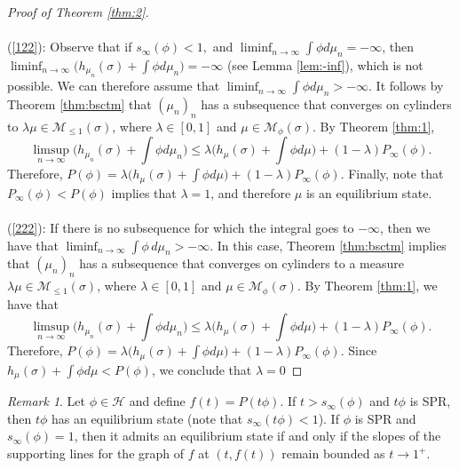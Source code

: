 \documentclass[letterpaper,11pt]{amsart}
\theoremstyle{plain}
\theoremstyle{plain}
\theoremstyle{definition}
\theoremstyle{remark}
\newtheorem{remark}{Remark}[section]
\def\M{{\mathcal M}}
\def\H{{\mathcal H}}
\begin{document}
\begin{proof}[Proof of Theorem \ref{thm:2}] 
\noindent\\\\
(\ref{122}): Observe that if $s_\infty(\phi)<1,$ and $\liminf_{n\to\infty}\int \phi d\mu_n=-\infty$, then $\liminf_{n\to\infty} \big(h_{\mu_n}(\sigma)+\int \phi d\mu_n\big)=-\infty$ (see Lemma \ref{lem:-inf}), which is not possible. We can therefore assume that $\liminf_{n\to\infty}\int \phi  d\mu_n>-\infty$. It follows by Theorem \ref{thm:bsctm} that $(\mu_n)_n$ has a subsequence that converges on cylinders to $\lambda\mu\in\M_{\le 1}(\sigma)$, where $\lambda\in [0,1]$ and $\mu\in \M_{\phi}(\sigma)$. By Theorem \ref{thm:1},
$$\limsup_{n\to\infty}\big(h_{\mu_n}(\sigma)+\int \phi d\mu_n\big)\le \lambda\big(h_\mu(\sigma)+\int \phi d\mu\big)+(1-\lambda)P_\infty(\phi).$$
Therefore, $P(\phi)= \lambda\big(h_\mu(\sigma)+\int \phi d\mu\big)+(1-\lambda)P_\infty(\phi)$. Finally, note that $P_\infty(\phi)<P(\phi)$ implies that $\lambda=1$, and therefore $\mu$ is an equilibrium state.\\\\
(\ref{222}): If there is no subsequence for which the integral goes to $-\infty$, then we have that  $\liminf_{n \to \infty} \int \phi \, d\mu_n > -\infty$.  In this case, Theorem \ref{thm:bsctm} implies that $(\mu_n)_n$ has a subsequence that converges on cylinders to a measure $\lambda\mu\in\M_{\le 1}(\sigma)$, where $\lambda\in [0,1]$ and $\mu\in \M_{\phi}(\sigma)$. By Theorem \ref{thm:1}, we have that 
$$\limsup_{n\to\infty}\big(h_{\mu_n}(\sigma)+\int \phi d\mu_n\big)\le \lambda\big(h_\mu(\sigma)+\int \phi d\mu\big)+(1-\lambda)P_\infty(\phi).$$
Therefore, $P(\phi)=\lambda\big(h_\mu(\sigma)+\int \phi d\mu\big)+(1-\lambda)P_\infty(\phi)$. Since $h_\mu(\sigma)+\int \phi d\mu<P(\phi)$, we conclude that $\lambda=0$
\end{proof}

\begin{remark} Let $\phi\in \H$ and define $f(t)=P(t\phi)$. If $t>s_\infty(\phi)$ and $t\phi$ is SPR, then $t\phi$  has an equilibrium state (note that  $s_\infty(t\phi)<1$). If $\phi$ is SPR and $s_\infty(\phi)=1$, then it admits an equilibrium state if and only if the slopes of the supporting lines for the graph of $f$ at $(t,f(t))$ remain bounded as $t\to 1^+$.
\end{remark}


\end{document}
